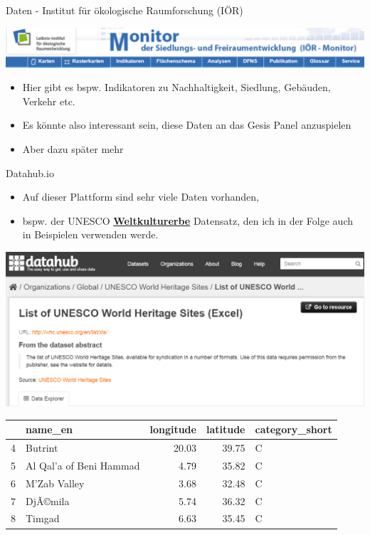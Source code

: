 \documentclass[ignorenonframetext,]{beamer}
\providecommand{\tightlist}{%
  \setlength{\itemsep}{0pt}\setlength{\parskip}{0pt}}
\begin{document}
\begin{frame}{Daten - Institut für ökologische Raumforschung (IÖR)}
\protect\hypertarget{daten---institut-fur-okologische-raumforschung-ior}{}

\includegraphics{figure/ioerMonitor.PNG}

\begin{itemize}
\tightlist
\item
  Hier gibt es bspw. Indikatoren zu Nachhaltigkeit, Siedlung, Gebäuden,
  Verkehr etc.
\item
  Es könnte also interessant sein, diese Daten an das Gesis Panel
  anzuspielen
\item
  Aber dazu später mehr
\end{itemize}

\end{frame}

\begin{frame}{Datahub.io}
\protect\hypertarget{datahub.io}{}

\begin{itemize}
\tightlist
\item
  Auf dieser Plattform sind sehr viele Daten vorhanden,
\item
  bspw. der UNESCO
  \href{http://datahub.io/dataset/unesco-world-heritage-sites/resource/d4116195-44d8-4bc1-9f91-9b570870dc19}{\textbf{Weltkulturerbe}}
  Datensatz, den ich in der Folge auch in Beispielen verwenden werde.
\end{itemize}

\includegraphics{figure/datahub_whc.PNG}

\begin{longtable}[]{@{}llrrl@{}}
\toprule
& name\_en & longitude & latitude & category\_short\tabularnewline
\midrule
\endhead
4 & Butrint & 20.03 & 39.75 & C\tabularnewline
5 & Al Qal'a of Beni Hammad & 4.79 & 35.82 & C\tabularnewline
6 & M'Zab Valley & 3.68 & 32.48 & C\tabularnewline
7 & DjÃ©mila & 5.74 & 36.32 & C\tabularnewline
8 & Timgad & 6.63 & 35.45 & C\tabularnewline
\bottomrule
\end{longtable}

\end{frame}
\end{document}
